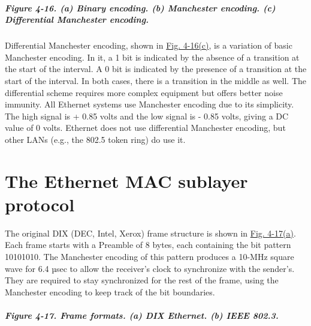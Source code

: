 \subparagraph[Figure 4-16. (a) Binary encoding. (b) Manchester encoding.
(c) Differential Manchester
encoding.]{\texorpdfstring{\protect\hypertarget{0130661023_ch04lev1sec3.htmlux5cux23ch04fig16}{}{}Figure
4-16. (a) Binary encoding. (b) Manchester encoding. (c) Differential
Manchester
encoding.}{Figure 4-16. (a) Binary encoding. (b) Manchester encoding. (c) Differential Manchester encoding.}}


Differential Manchester encoding, shown in
\protect\hyperlink{0130661023_ch04lev1sec3.htmlux5cux23ch04fig16}{Fig.
4-16(c)}, is a variation of basic Manchester encoding. In it, a 1 bit is
indicated by the absence of a transition at the start of the interval. A
0 bit is indicated by the presence of a transition at the start of the
interval. In both cases, there is a transition in the middle as well.
The differential scheme requires more complex equipment but offers
better noise immunity. All Ethernet systems use Manchester encoding due
to its simplicity. The high signal is + 0.85 volts and the low signal is
- 0.85 volts, giving a DC value of 0 volts. Ethernet does not use
differential Manchester encoding, but other LANs (e.g., the 802.5 token
ring) do use it.

\protect\hypertarget{0130661023_ch04lev1sec3.htmlux5cux23ch04lev2sec11}{}{}

\section{The Ethernet MAC sublayer protocol}

The original DIX (DEC, Intel, Xerox) frame structure is shown in
\protect\hyperlink{0130661023_ch04lev1sec3.htmlux5cux23ch04fig17}{Fig.
4-17(a)}. Each frame starts with a {Preamble} of 8 bytes, each
containing the bit pattern 10101010. The Manchester encoding of this
pattern produces a 10-MHz square wave for 6.4 µsec to allow the
receiver's clock to synchronize with the sender's. They are required to
stay synchronized for the rest of the frame, using the Manchester
encoding to keep track of the bit boundaries.

\subparagraph[Figure 4-17. Frame formats. (a) DIX Ethernet. (b) IEEE
802.3.]{\texorpdfstring{\protect\hypertarget{0130661023_ch04lev1sec3.htmlux5cux23ch04fig17}{}{}Figure
4-17. Frame formats. (a) DIX Ethernet. (b) IEEE
802.3.}{Figure 4-17. Frame formats. (a) DIX Ethernet. (b) IEEE 802.3.}}


